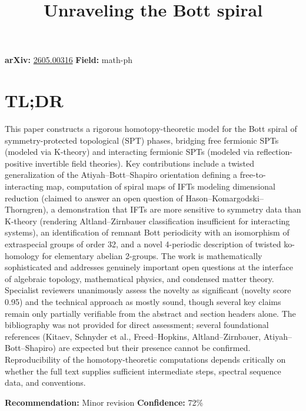 \documentclass[11pt]{article}
\title{Unraveling the Bott spiral}
\date{}
\begin{document}
\maketitle

\noindent\textbf{arXiv:} \href{https://arxiv.org/abs/2605.00316}{2605.00316} \quad \textbf{Field:} math-ph\\

\section*{TL;DR}
This paper constructs a rigorous homotopy-theoretic model for the Bott spiral of symmetry-protected topological (SPT) phases, bridging free fermionic SPTs (modeled via K-theory) and interacting fermionic SPTs (modeled via reflection-positive invertible field theories). Key contributions include a twisted generalization of the Atiyah–Bott–Shapiro orientation defining a free-to-interacting map, computation of spiral maps of IFTs modeling dimensional reduction (claimed to answer an open question of Hason–Komargodski–Thorngren), a demonstration that IFTs are more sensitive to symmetry data than K-theory (rendering Altland–Zirnbauer classification insufficient for interacting systems), an identification of remnant Bott periodicity with an isomorphism of extraspecial groups of order 32, and a novel 4-periodic description of twisted ko-homology for elementary abelian 2-groups. The work is mathematically sophisticated and addresses genuinely important open questions at the interface of algebraic topology, mathematical physics, and condensed matter theory. Specialist reviewers unanimously assess the novelty as significant (novelty score 0.95) and the technical approach as mostly sound, though several key claims remain only partially verifiable from the abstract and section headers alone. The bibliography was not provided for direct assessment; several foundational references (Kitaev, Schnyder et al., Freed–Hopkins, Altland–Zirnbauer, Atiyah–Bott–Shapiro) are expected but their presence cannot be confirmed. Reproducibility of the homotopy-theoretic computations depends critically on whether the full text supplies sufficient intermediate steps, spectral sequence data, and conventions.

\textbf{Recommendation:} Minor revision \quad \textbf{Confidence:} 72\%\\
\end{document}
